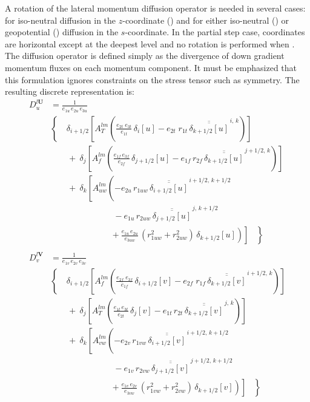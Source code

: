 \documentclass[../tex_main/NEMO_manual]{subfiles}
\begin{document}
A rotation of the lateral momentum diffusion operator is needed in several cases:
for iso-neutral diffusion in the $z$-coordinate () and
for either iso-neutral () or
geopotential () diffusion in the $s$-coordinate.
In the partial step case, coordinates are horizontal except at the deepest level and
no rotation is performed when .
The diffusion operator is defined simply as the divergence of down gradient momentum fluxes on
each momentum component.
It must be emphasized that this formulation ignores constraints on the stress tensor such as symmetry.
The resulting discrete representation is:
\begin{equation} \label{eq:dyn_ldf_iso}
\begin{split}
 D_u^{l\textbf{U}} &= \frac{1}{e_{1u} \, e_{2u} \, e_{3u} }	\\
&  \left\{\quad  {\delta _{i+1/2} \left[ {A_T^{lm}  \left( 
	 {\frac{e_{2t} \; e_{3t} }{e_{1t} } \,\delta _{i}[u]
	-e_{2t} \; r_{1t} \,\overline{\overline {\delta _{k+1/2}[u]}}^{\,i,\,k}}
 \right)} \right]} 	\right.
\\ 
& \qquad +\ \delta_j \left[ {A_f^{lm} \left( {\frac{e_{1f}\,e_{3f} }{e_{2f} 
}\,\delta _{j+1/2} [u] - e_{1f}\, r_{2f} 
\,\overline{\overline {\delta _{k+1/2} [u]}} ^{\,j+1/2,\,k}} 
\right)} \right] 
\\ 
&\qquad +\ \delta_k \left[ {A_{uw}^{lm} \left( {-e_{2u} \, r_{1uw} \,\overline{\overline 
{\delta_{i+1/2} [u]}}^{\,i+1/2,\,k+1/2} } 
\right.} \right. 
\\ 
&  \ \qquad \qquad \qquad \quad\ 
- e_{1u} \, r_{2uw} \,\overline{\overline {\delta_{j+1/2} [u]}} ^{\,j,\,k+1/2}
\\ 
& \left. {\left. { \ \qquad \qquad \qquad \ \ \ \left. {\ 
+\frac{e_{1u}\, e_{2u} }{e_{3uw} }\,\left( {r_{1uw}^2+r_{2uw}^2} 
\right)\,\delta_{k+1/2} [u]} \right)} \right]\;\;\;} \right\} 
\\
\\
 D_v^{l\textbf{V}} &= \frac{1}{e_{1v} \, e_{2v} \, e_{3v} }    \\
&  \left\{\quad  {\delta _{i+1/2} \left[ {A_f^{lm}  \left( 
	 {\frac{e_{2f} \; e_{3f} }{e_{1f} } \,\delta _{i+1/2}[v]
	-e_{2f} \; r_{1f} \,\overline{\overline {\delta _{k+1/2}[v]}}^{\,i+1/2,\,k}}
 \right)} \right]} 	\right.
\\ 
& \qquad +\ \delta_j \left[ {A_T^{lm} \left( {\frac{e_{1t}\,e_{3t} }{e_{2t} 
}\,\delta _{j} [v] - e_{1t}\, r_{2t} 
\,\overline{\overline {\delta _{k+1/2} [v]}} ^{\,j,\,k}} 
\right)} \right] 
\\ 
& \qquad +\ \delta_k \left[ {A_{vw}^{lm} \left( {-e_{2v} \, r_{1vw} \,\overline{\overline 
{\delta_{i+1/2} [v]}}^{\,i+1/2,\,k+1/2} }\right.} \right. 
\\
&  \ \qquad \qquad \qquad \quad\ 
- e_{1v} \, r_{2vw} \,\overline{\overline {\delta_{j+1/2} [v]}} ^{\,j+1/2,\,k+1/2}
\\ 
& \left. {\left. { \ \qquad \qquad \qquad \ \ \ \left. {\ 
+\frac{e_{1v}\, e_{2v} }{e_{3vw} }\,\left( {r_{1vw}^2+r_{2vw}^2} 
\right)\,\delta_{k+1/2} [v]} \right)} \right]\;\;\;} \right\} 
 \end{split}
\end{equation}
\end{document}
